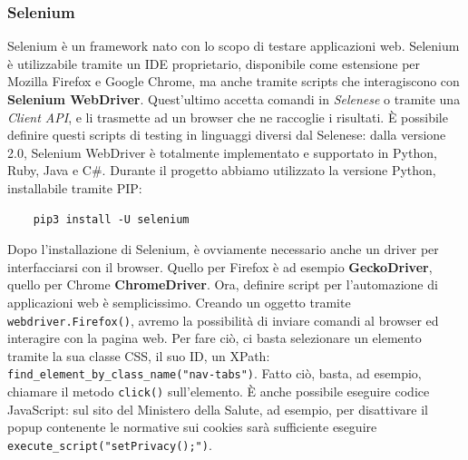 \subsubsection{Selenium}
Selenium è un framework nato con lo scopo di testare applicazioni web. Selenium è utilizzabile tramite un IDE proprietario, disponibile come estensione per Mozilla Firefox e Google Chrome, ma anche tramite scripts che interagiscono con \textbf{Selenium WebDriver}. Quest'ultimo accetta comandi in \textit{Selenese} o tramite una \textit{Client API}, e li trasmette ad un browser che ne raccoglie i risultati. È possibile definire questi scripts di testing in linguaggi diversi dal Selenese: dalla versione 2.0, Selenium WebDriver è totalmente implementato e supportato in Python, Ruby, Java e C\#. Durante il progetto abbiamo utilizzato la versione Python, installabile tramite PIP:
\begin{verbatim}
    pip3 install -U selenium
\end{verbatim}
Dopo l'installazione di Selenium, è ovviamente necessario anche un driver per interfacciarsi con il browser. Quello per Firefox è ad esempio \textbf{GeckoDriver}, quello per Chrome \textbf{ChromeDriver}. Ora, definire script per l'automazione di applicazioni web è semplicissimo. Creando un oggetto tramite \texttt{webdriver.Firefox()}, avremo la possibilità di inviare comandi al browser ed interagire con la pagina web. Per fare ciò, ci basta selezionare un elemento tramite la sua classe CSS, il suo ID, un XPath: \texttt{find\_element\_by\_class\_name("nav-tabs")}. Fatto ciò, basta, ad esempio, chiamare il metodo \texttt{click()} sull'elemento. È anche possibile eseguire codice JavaScript: sul sito del Ministero della Salute, ad esempio, per disattivare il popup contenente le normative sui cookies sarà sufficiente eseguire \texttt{execute\_script("setPrivacy();")}.
